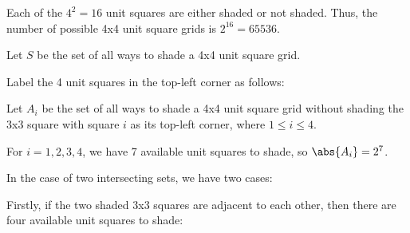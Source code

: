 \begin{solution}
    \begin{ppart}
        \begin{psubpart}
            Each of the $4^2 = 16$ unit squares are either shaded or not shaded. Thus, the number of possible 4x4 unit square grids is $2^{16} = 65536$.
        \end{psubpart}
        \begin{psubpart}
            Let $S$ be the set of all ways to shade a 4x4 unit square grid.
        
            Label the 4 unit squares in the top-left corner as follows:

            \begin{center}
            \end{center}

            Let $A_i$ be the set of all ways to shade a 4x4 unit square grid without shading the 3x3 square with square $i$ as its top-left corner, where $1 \leq i \leq 4$.

            For $i = 1, 2, 3, 4$, we have 7 available unit squares to shade, so $\abs{A_i} = 2^7$.

            In the case of two intersecting sets, we have two cases:

            Firstly, if the two shaded 3x3 squares are adjacent to each other, then there are four available unit squares to shade:

            \begin{center}
\end{center}
\end{psubpart}
\end{ppart}
\end{solution}
